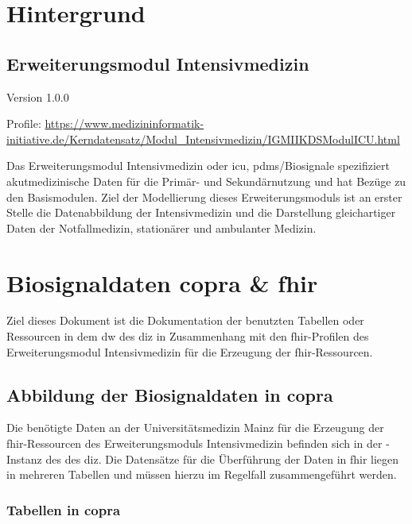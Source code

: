 \chapter{Hintergrund} \label{ch:backg}

\section{Erweiterungsmodul Intensivmedizin} \label{sec:icu}

Version 1.0.0

\noindent Profile: \url{https://www.medizininformatik-initiative.de/Kerndatensatz/Modul_Intensivmedizin/IGMIIKDSModulICU.html}

Das Erweiterungsmodul Intensivmedizin oder \ac{icu}, \acs{pdms}/Biosignale spezifiziert akutmedizinische Daten für die Primär- und Sekundärnutzung und hat Bezüge zu den Basismodulen. Ziel der Modellierung dieses Erweiterungsmoduls ist an erster Stelle die Datenabbildung der Intensivmedizin und die Darstellung gleichartiger Daten der Notfallmedizin, stationärer und ambulanter Medizin.

\chapter{Biosignaldaten \acs{copra} \& \acs{fhir}} \label{ch:coprafhir}

Ziel dieses Dokument ist die Dokumentation der benutzten Tabellen oder Ressourcen in dem \ac{dw} des \ac{diz} in Zusammenhang mit den \ac{fhir}-Profilen des Erweiterungsmodul Intensivmedizin für die Erzeugung der \ac{fhir}-Ressourcen.

\section{Abbildung der Biosignaldaten in \acs{copra}} \label{sec:copra}

Die benötigte Daten an der Universitätsmedizin Mainz für die Erzeugung der \ac{fhir}-Ressourcen des Erweiterungsmoduls Intensivmedizin befinden sich in der -Instanz des  des \ac{diz}. Die Datensätze für die Überführung der Daten in \ac{fhir} liegen in mehreren Tabellen und müssen hierzu im Regelfall zusammengeführt werden.

\subsection{Tabellen in \acs{copra}} \label{subsec:copratab}

